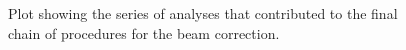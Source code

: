 \documentclass[10pt,a4paper]{article}
\begin{document}
\begin{enumerate}
\begin{figure}[h!]
\begin{center}
	 			\caption[Plot showing the series of analyses that contributed to the final chain of procedures for the beam correction]{\label{fig:beam_cor_progession}Plot showing the series of analyses that contributed to the final chain of procedures for the beam correction.}
	 		\end{center}\end{figure}
	 	\end{enumerate}
\end{document}
